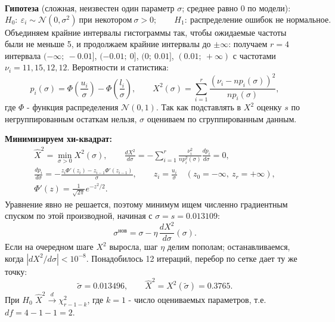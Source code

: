\documentclass[12pt]{spbstu-task}
\begin{document}
\textbf{Гипотеза} (сложная, неизвестен один параметр \(\sigma\); среднее равно 0 по модели):
\begin{displaymath}
  H_0:\ \varepsilon_i \sim \mathcal{N}(0, \sigma^2)\ \text{при некотором}\ \sigma > 0;\qquad
  H_1:\ \text{распределение ошибок не нормальное}.
\end{displaymath}
Объединяем крайние интервалы гистограммы так, чтобы ожидаемые частоты были не меньше 5, и продолжаем крайние
интервалы до \(\pm\infty\): получаем \(r = 4\) интервала \((-\infty;\ -0.01]\), \((-0.01;\ 0]\), \((0;\ 0.01]\),
\((0.01;\ +\infty)\) с частотами \(\nu_i = 11, 15, 12, 12\). Вероятности и статистика:
\begin{displaymath}
  p_i(\sigma) = \Phi\left(\frac{u_i}{\sigma}\right) - \Phi\left(\frac{l_i}{\sigma}\right),\qquad
  X^2(\sigma) = \sum_{i=1}^{r}\frac{\left(\nu_i - np_i(\sigma)\right)^2}{np_i(\sigma)},
\end{displaymath}
где \(\Phi\) - функция распределения \(\mathcal{N}(0, 1)\). Так как подставлять в \(X^2\) оценку \(s\) по
негруппированным остаткам нельзя, \(\sigma\) оцениваем по сгруппированным данным.

\textbf{Минимизируем хи-квадрат:}
\begin{gather*}
  \hat{X}^2 = \min_{\sigma > 0} X^2(\sigma),\qquad
  \frac{dX^2}{d\sigma} = -\sum_{i=1}^{r}\frac{\nu_i^2}{np_i^2(\sigma)}\frac{dp_i}{d\sigma} = 0,\\
  \frac{dp_i}{d\sigma} = -\frac{z_i\Phi'(z_i) - z_{i-1}\Phi'(z_{i-1})}{\sigma},\qquad
  z_i = \frac{u_i}{\sigma}\quad(z_0 = -\infty,\ z_r = +\infty),\\
  \Phi'(z) = \frac{1}{\sqrt{2\pi}}e^{-z^2/2}.
\end{gather*}
Уравнение явно не решается, поэтому минимум ищем численно градиентным спуском по этой производной, начиная
с \(\sigma = s = 0.013109\):
\begin{displaymath}
  \sigma^{\text{нов}} = \sigma - \eta\,\frac{dX^2}{d\sigma}(\sigma).
\end{displaymath}
Если на очередном шаге \(X^2\) выросла, шаг \(\eta\) делим пополам; останавливаемся, когда
\(\left|dX^2/d\sigma\right| < 10^{-8}\). Понадобилось 12 итераций, перебор по сетке дает ту же точку:
\begin{displaymath}
  \tilde{\sigma} = 0.013496,\qquad \hat{X}^2 = X^2(\tilde{\sigma}) = 0.3765.
\end{displaymath}
При \(H_0\) \(\hat{X}^2 \xrightarrow{d} \chi^2_{r - 1 - k}\), где \(k = 1\) - число оцениваемых параметров,
т.е. \(df = 4 - 1 - 1 = 2\).
\end{document}
